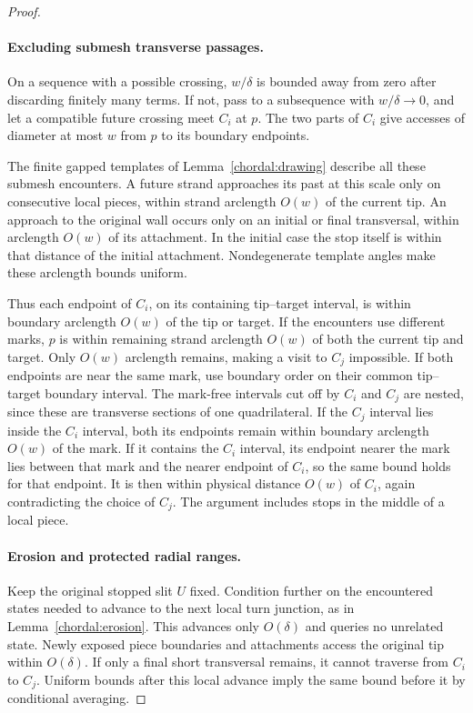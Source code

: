 \begin{proof}
\paragraph{Excluding submesh transverse passages.}
On a sequence with a possible crossing, $w/\delta$ is bounded away
from zero after discarding finitely many terms.  If not, pass to
a subsequence with $w/\delta\to0$, and let a compatible future
crossing meet $C_i$ at $p$.  The two parts of $C_i$ give accesses
of diameter at most $w$ from $p$ to its boundary endpoints.

The finite gapped templates of Lemma~\ref{chordal:drawing} describe
all these submesh encounters.  A future strand approaches its past
at this scale only on consecutive local pieces, within strand
arclength $O(w)$ of the current tip.  An approach to the original
wall occurs only on an initial or final transversal, within
arclength $O(w)$ of its attachment.  In the initial case the stop
itself is within that distance of the initial attachment.
Nondegenerate template angles make these arclength bounds uniform.

Thus each endpoint of $C_i$, on its containing tip--target interval,
is within boundary arclength $O(w)$ of the tip or target.  If the
encounters use different marks, $p$ is within remaining strand
arclength $O(w)$ of both the current tip and target.  Only $O(w)$
arclength remains, making a visit to $C_j$ impossible.  If both
endpoints are near the same mark, use boundary order on their common
tip--target boundary interval.  The mark-free intervals cut off by
$C_i$ and $C_j$ are nested, since these are transverse sections of
one quadrilateral.  If the $C_j$ interval lies inside the $C_i$
interval, both its endpoints remain within boundary arclength $O(w)$
of the mark.  If it contains the $C_i$ interval, its endpoint nearer
the mark lies between that mark and the nearer endpoint of $C_i$,
so the same bound holds for that endpoint.  It is then within physical
distance $O(w)$ of $C_i$, again contradicting the choice of $C_j$.
The argument includes stops in the middle of a local piece.

\paragraph{Erosion and protected radial ranges.}
Keep the original stopped slit $U$ fixed.  Condition further on
the encountered states needed to advance to the next local turn
junction, as in Lemma~\ref{chordal:erosion}.  This advances only
$O(\delta)$ and queries no unrelated state.  Newly exposed piece
boundaries and attachments access the original tip within
$O(\delta)$.  If only a final short transversal remains, it cannot
traverse from $C_i$ to $C_j$.  Uniform bounds after this local
advance imply the same bound before it by conditional averaging.


\end{proof}
